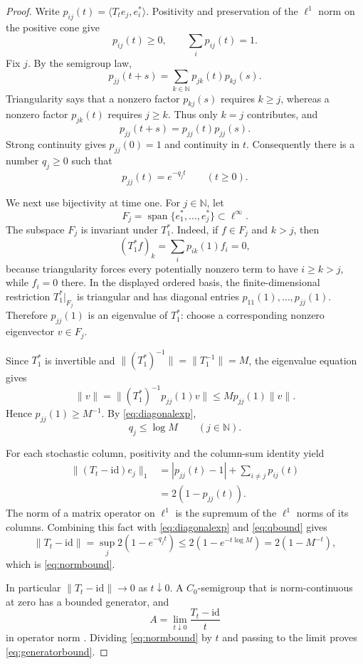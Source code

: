 \documentclass[11pt]{article}
\newcommand{\N}{\mathbb{N}}
\newcommand{\id}{\mathrm{id}}
\begin{document}
\begin{proof}
Write $p_{ij}(t)=\langle T_te_j,e_i^*\rangle$. Positivity and preservation of
the $\ell^1$ norm on the positive cone give
\[
  p_{ij}(t)\ge0,
  \qquad \sum_i p_{ij}(t)=1.
\]
Fix $j$. By the semigroup law,
\[
  p_{jj}(t+s)=\sum_{k\in\N}p_{jk}(t)p_{kj}(s).
\]
Triangularity says that a nonzero factor $p_{kj}(s)$ requires $k\ge j$,
whereas a nonzero factor $p_{jk}(t)$ requires $j\ge k$. Thus only $k=j$
contributes, and
\begin{equation}\label{eq:multiplicative}
  p_{jj}(t+s)=p_{jj}(t)p_{jj}(s).
\end{equation}
Strong continuity gives $p_{jj}(0)=1$ and continuity in $t$. Consequently
there is a number $q_j\ge0$ such that
\begin{equation}\label{eq:diagonalexp}
  p_{jj}(t)=e^{-q_jt}\qquad(t\ge0).
\end{equation}

We next use bijectivity at time one. For $j\in\N$, let
\[
  F_j=\operatorname{span}\{e_1^*,\ldots,e_j^*\}\subset\ell^\infty.
\]
The subspace $F_j$ is invariant under $T_1^*$. Indeed, if $f\in F_j$ and
$k>j$, then
\[
  (T_1^*f)_k=\sum_i p_{ik}(1)f_i=0,
\]
because triangularity forces every potentially nonzero term to have
$i\ge k>j$, while $f_i=0$ there. In the displayed ordered basis, the
finite-dimensional restriction $T_1^*|_{F_j}$ is triangular and has diagonal
entries $p_{11}(1),\ldots,p_{jj}(1)$. Therefore $p_{jj}(1)$ is an eigenvalue
of $T_1^*$: choose a corresponding nonzero eigenvector $v\in F_j$.

Since $T_1^*$ is invertible and
$\|(T_1^*)^{-1}\|=\|T_1^{-1}\|=M$, the eigenvalue equation gives
\[
  \|v\|=\|(T_1^*)^{-1}p_{jj}(1)v\|
  \le M p_{jj}(1)\|v\|.
\]
Hence $p_{jj}(1)\ge M^{-1}$. By \eqref{eq:diagonalexp},
\begin{equation}\label{eq:qbound}
  q_j\le\log M\qquad(j\in\N).
\end{equation}

For each stochastic column, positivity and the column-sum identity yield
\begin{align*}
  \|(T_t-\id)e_j\|_1
  &=|p_{jj}(t)-1|+\sum_{i\ne j}p_{ij}(t)\\
  &=2(1-p_{jj}(t)).
\end{align*}
The norm of a matrix operator on $\ell^1$ is the supremum of the $\ell^1$
norms of its columns. Combining this fact with \eqref{eq:diagonalexp} and
\eqref{eq:qbound} gives
\[
  \|T_t-\id\|
  =\sup_j2(1-e^{-q_jt})
  \le2(1-e^{-t\log M})
  =2(1-M^{-t}),
\]
which is \eqref{eq:normbound}.

In particular $\|T_t-\id\|\to0$ as $t\downarrow0$. A $C_0$-semigroup that
is norm-continuous at zero has a bounded generator, and
\[
  A=\lim_{t\downarrow0}\frac{T_t-\id}{t}
\]
in operator norm \cite[Chapter~I]{engelnagel}. Dividing
\eqref{eq:normbound} by $t$ and passing to the limit proves
\eqref{eq:generatorbound}.
\end{proof}
\end{document}
